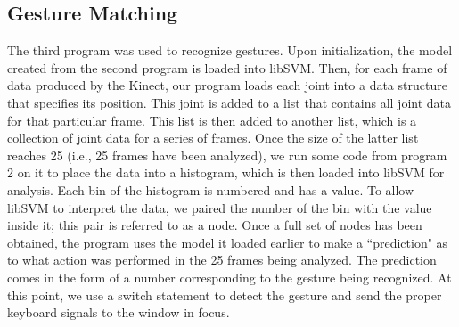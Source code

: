 \documentclass[11pt,conference]{IEEEtran}
\begin{document}
\subsection{Gesture Matching}
The third program was used to recognize gestures. Upon initialization, the model created from the second program is loaded into libSVM. Then, for each frame of data produced by the Kinect, our program loads each joint into a data structure that specifies its position. This joint is added to a list that contains all joint data for that particular frame. This list is then added to another list, which is a collection of joint data for a series of frames. Once the size of the latter list reaches 25 (i.e., 25 frames have been analyzed), we run some code from program 2 on it to place the data into a histogram, which is then loaded into libSVM for analysis. Each bin of the histogram is numbered and has a value. To allow libSVM to interpret the data, we paired the number of the bin with the value inside it; this pair is referred to as a node. Once a full set of nodes has been obtained, the program uses the model it loaded earlier to make a ``prediction" as to what action was performed in the 25 frames being analyzed. The prediction comes in the form of a number corresponding to the gesture being recognized. At this point, we use a switch statement to detect the gesture and send the proper keyboard signals to the window in focus.
\end{document}
